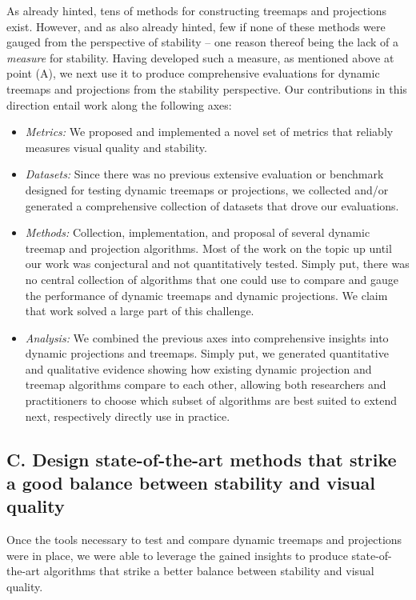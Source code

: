 As already hinted, tens of methods for constructing treemaps and projections exist. However, and as also already hinted, few if none of these methods were gauged from the perspective of stability -- one reason thereof being the lack of a \emph{measure} for stability. Having developed such a measure, as mentioned above at point (A), we next use it to produce comprehensive evaluations for dynamic treemaps and projections from the stability perspective. Our contributions in this direction entail work along the following axes:

\begin{itemize}
    \item \emph{Metrics:} We proposed and implemented a novel set of metrics that reliably measures visual quality and stability.
    \item \emph{Datasets:} Since there was no previous extensive evaluation or benchmark designed for testing dynamic treemaps or projections, we collected and/or generated a comprehensive collection of datasets that drove our evaluations. 
    \item \emph{Methods:} Collection, implementation, and proposal of several dynamic treemap and projection algorithms. Most of the work on the topic up until our work was conjectural and not quantitatively tested.  Simply put, there was no central collection of algorithms that one could use to compare and gauge the performance of dynamic treemaps and dynamic projections. We claim that work solved a large part of this challenge.
    \item \emph{Analysis:} We combined the previous axes into comprehensive insights into dynamic projections and treemaps. Simply put, we generated quantitative and qualitative evidence showing how existing dynamic projection and treemap algorithms compare to each other, allowing both researchers and practitioners to choose which subset of algorithms are best suited to extend next, respectively directly use in practice.
\end{itemize}

\subsection*{C. Design state-of-the-art methods that strike a good balance between stability and visual quality}

Once the tools necessary to test and compare dynamic treemaps and projections were in place, we were able to leverage the gained insights to produce state-of-the-art algorithms that strike a better balance between stability and visual quality.

